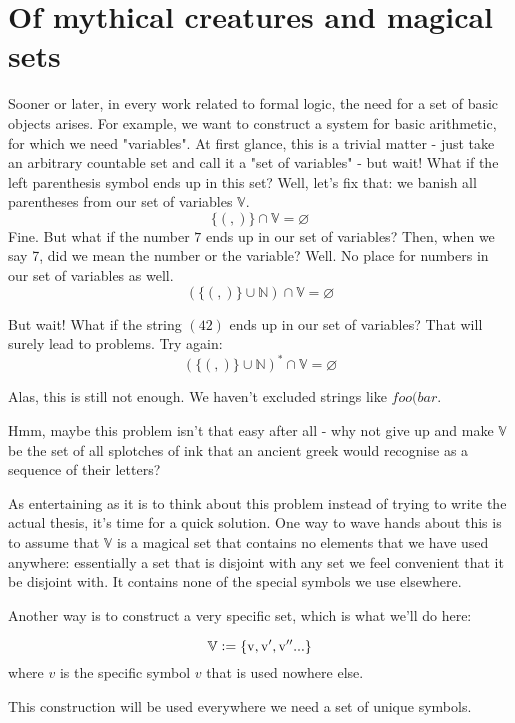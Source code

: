 \documentclass[main.tex]{subfiles}
\begin{document}
\section{Of mythical creatures and magical sets}
\label{sec:magic}

Sooner or later, in every work related to formal logic, the need for
a set of basic objects arises. For example, we want to construct a system for basic
arithmetic, for which we need "variables".
At first glance, this is a trivial matter - just take an arbitrary countable
set and call it a "set of variables" - but wait! What if the left parenthesis
symbol ends up in this set? Well, let's fix that: we banish all parentheses
from our set of variables $\mathbb{V}$.
\[ \{ (, ) \} \cap \mathbb{V} = \varnothing \]
Fine. But what if the number $7$ ends up in our set of variables? Then,
when we say 7, did we mean the number or the variable? Well. No place for
numbers in our set of variables as well.
\[ ( \{ (, ) \} \cup \mathbb{N} ) \cap \mathbb{V} = \varnothing \]

But wait! What if the string $(42)$ ends up in our set of variables? That will
surely lead to problems. Try again:
\[ ( \{ (, ) \} \cup \mathbb{N} )^* \cap \mathbb{V} = \varnothing \]

Alas, this is still not enough. We haven't excluded strings like $foo(bar$.

Hmm, maybe this problem isn't that easy after all - why not give up and make
$\mathbb{V}$ be the set of all splotches of ink that an ancient greek would
recognise as a sequence of their letters?

As entertaining as it is to think about this problem instead of trying to write
the actual thesis, it's time for a quick solution. One way to wave hands
about this is to assume that $\mathbb{V}$ is a magical set that contains
no elements that we have used anywhere: essentially a set that is disjoint
with any set we feel convenient that it be disjoint with. It contains none of
the special symbols we use elsewhere.

Another way is to construct a very specific set, which is what we'll do here:

\[ \mathbb{V} \vcentcolon= \{ \mathrm{v}, \mathrm{v'}, \mathrm{v''} ... \} \]
where $v$ is the specific symbol $v$ that is used nowhere else.

This construction will be used everywhere we need a set of unique symbols.
\end{document}
